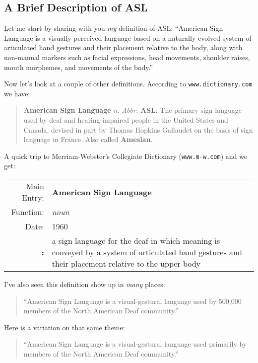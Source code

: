 \documentclass{article}
\begin{document}
\subsection{A Brief Description of ASL}

Let me start by sharing with you \emph{my} definition of ASL:
``American Sign Language is a visually perceived language based on a naturally evolved system of articulated hand gestures and their placement relative to the body, along with non-manual markers such as facial expressions, head movements, shoulder raises, mouth morphemes, and movements of the body.''

Now let's look at a couple of other definitions.
According to \texttt{www.dictionary.com} we have:

\begin{quote}
\textbf{American Sign Language} \textit{n. Abbr.} \textbf{ASL}:
The primary sign language used by deaf and hearing-impaired people in the United States and Canada, devised in part by Thomas Hopkins Gallaudet on the basis of sign language in France.
Also called \textbf{Ameslan}.
\end{quote}

A quick trip to Merriam-Webster's Collegiate Dictionary (\texttt{www.m-w.com}) and we get:

\begin{tabular}{rp{10cm}}
Main Entry:&\textbf{American Sign Language}\\
Function:&\emph{noun}\\
Date:&1960\\
\textbf{:}&a sign language for the deaf in which meaning is conveyed by a system of articulated hand gestures and their placement relative to the upper body\\
\end{tabular}

I've also seen this definition show up in \emph{many} places:

\begin{quote}
``American Sign Language is a visual-gestural language used by 500,000 members of the North American Deaf community.''
\end{quote}

Here is a variation on that same theme:

\begin{quote}
``American Sign Language is a visual-gestural language used primarily by members of the North American Deaf community.''
\end{quote}
\end{document}

